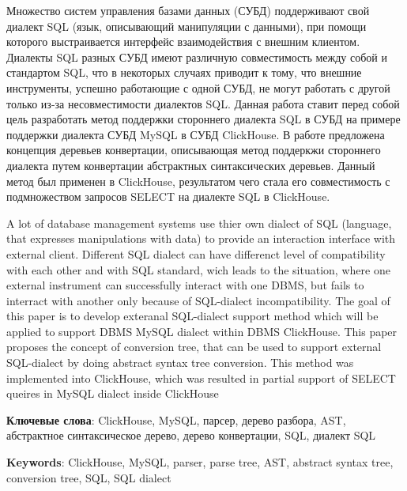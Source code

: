 Множество систем управления базами данных (СУБД) поддерживают свой диалект SQL (язык, описывающий манипуляции с данными), при помощи которого выстраивается интерфейс взаимодействия с внешним клиентом. Диалекты SQL разных СУБД имеют различную совместимость между собой и стандартом SQL, что в некоторых случаях приводит к тому, что внешние инструменты, успешно работающие с одной СУБД, не могут работать с другой только из-за несовместимости диалектов SQL. Данная работа ставит перед собой цель разработать метод поддержки стороннего диалекта SQL в СУБД на примере поддержки диалекта СУБД MySQL в СУБД ClickHouse. В работе предложена концепция деревьев конвертации, описывающая метод поддеркжи стороннего диалекта путем конвертации абстрактных синтаксических деревьев. Данный метод был применен в ClickHouse, результатом чего стала его совместимость с подмножеством запросов SELECT на диалекте SQL в ClickHouse.


A lot of database management systems use thier own dialect of SQL (language, that expresses manipulations with data) to provide an interaction interface with external client. Different SQL dialect can have differenct level of compatibility with each other and with SQL standard, wich leads to the situation, where one external instrument can successfully interact with one DBMS, but fails to interract with another only because of SQL-dialect incompatibility. The goal of this paper is to develop exteranal SQL-dialect support method which will be applied to support DBMS MySQL dialect within DBMS ClickHouse. This paper proposes the concept of conversion tree, that can be used to support external SQL-dialect by doing abstract syntax tree conversion. This method was implemented into ClickHouse, which was resulted in partial support of SELECT queires in MySQL dialect inside ClickHouse

\textbf{Ключевые слова}: ClickHouse, MySQL, парсер, дерево разбора, AST, абстрактное синтаксическое дерево, дерево конвертации, SQL, диалект SQL

\textbf{Keywords}: ClickHouse, MySQL, parser, parse tree, AST, abstract syntax tree, conversion tree, SQL, SQL dialect
